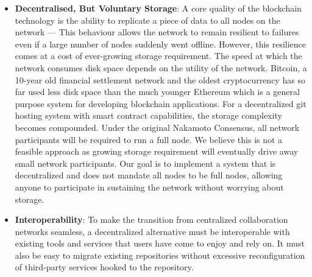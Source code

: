 \begin{itemize}
 	\item \textbf{Decentralised, But Voluntary Storage}: A core quality of the blockchain technology is the ability to replicate a piece of data to all nodes on the network — This behaviour allows the network to remain resilient to failures even if a large number of nodes suddenly went offline. However, this resilience comes at a cost of ever-growing storage requirement. The speed at which the network consumes disk space depends on the utility of the network. Bitcoin, a 10-year old financial settlement network and the oldest cryptocurrency has so far used less disk space than the much younger Ethereum which is a general purpose system for developing blockchain applications. For a decentralized git hosting system with smart contract capabilities, the storage complexity becomes compounded. Under the original Nakamoto Consensus, all network participants will be required to run a full node. We believe this is not a feasible approach as growing storage requirement will eventually drive away small network participants. Our goal is to implement a system that is decentralized and does not mandate all nodes to be full nodes, allowing anyone to participate in sustaining the network without worrying about storage.
 	\item \textbf{Interoperability}: To make the transition from centralized collaboration networks seamless, a decentralized alternative must be interoperable with existing tools and services that users have come to enjoy and rely on. It must also be easy to migrate existing repositories without excessive reconfiguration of third-party services hooked to the repository.
 \end{itemize}
 
 
